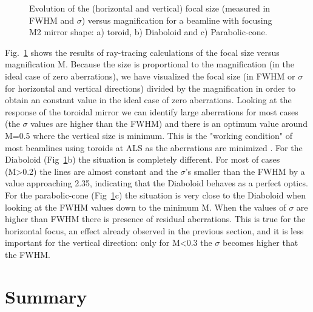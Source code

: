 \documentclass{iucr}              %
\begin{document}
\begin{figure}[h]
\caption{\label{fig:scan}
Evolution of the (horizontal and vertical) focal size (measured in FWHM and $\sigma$) versus magnification for a beamline with focusing M2 mirror shape: a) toroid, b) Diaboloid and c) Parabolic-cone. 
}
\end{figure}


Fig.~\ref{fig:scan} shows the results of ray-tracing calculations of the focal size versus magnification M. Because the size is proportional to the magnification (in the ideal case of zero aberrations), we have visualized the focal size (in FWHM or $\sigma$ for horizontal and vertical directions) divided by the magnification in order to obtain an constant value in the ideal case of zero aberrations. Looking at the response of the toroidal mirror we can identify large aberrations for most cases (the $\sigma$ values are higher than the FWHM) and there is an optimum value around M=0.5 where the vertical size is minimum. This is the "working condition" of most beamlines using toroids at ALS as the aberrations are minimized \cite{padmore2000,howells2000}. For the Diaboloid (Fig~\ref{fig:scan}b) the situation is completely different. For most of cases (M>0.2) the lines are almost constant and the $\sigma$'s smaller than the FWHM by a value approaching 2.35, indicating that the Diaboloid behaves as a perfect optics. For the parabolic-cone (Fig~\ref{fig:scan}c) the situation is very close to the Diaboloid when looking at the FWHM values down to the minimum M. When the values of $\sigma$ are higher than FWHM there is presence of residual aberrations. This is true for the horizontal focus, an effect already observed in the previous section, and it is less important for the vertical direction: only for M<0.3 the $\sigma$ becomes higher that the FWHM.  



\section{Summary}
\label{sec:summary}
\end{document}

